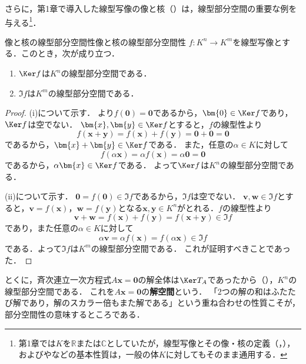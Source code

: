 さらに，第1章で導入した線型写像の像と核（）は，線型部分空間の重要な例を与える\footnote{第1章では$K$を$\mathbb{R}$または$\mathbb{C}$としていたが，線型写像とその像・核の定義（，），およびやなどの基本性質は，一般の体$K$に対してもそのまま通用する．}．

\begin{prop}{像と核の線型部分空間性}{像と核の線型部分空間性}
  $f \colon K^n \to K^m$を線型写像とする．このとき，次が成り立つ．
  \begin{enumerate}[label=(\roman*),leftmargin=3.2em]
    \item $\Ker f$は$K^n$の線型部分空間である．
    \item $\Im f$は$K^m$の線型部分空間である．
  \end{enumerate}
\end{prop}

\begin{leftbar}
\begin{proof}
  (i)について示す．
  より$f(\bm{0}) = \bm{0}$であるから，$\bm{0} \in \Ker f$であり，$\Ker f$は空でない．
  $\bm{x}, \bm{y} \in \Ker f$とすると，$f$の線型性より
  \[
    f(\bm{x} + \bm{y}) = f(\bm{x}) + f(\bm{y}) = \bm{0} + \bm{0} = \bm{0}
  \]
  であるから，$\bm{x} + \bm{y} \in \Ker f$である．
  また，任意の$\alpha \in K$に対して
  \[
    f(\alpha\bm{x}) = \alpha f(\bm{x}) = \alpha\bm{0} = \bm{0}
  \]
  であるから，$\alpha\bm{x} \in \Ker f$である．
  よって$\Ker f$は$K^n$の線型部分空間である．

  (ii)について示す．
  $\bm{0} = f(\bm{0}) \in \Im f$であるから，$\Im f$は空でない．
  $\bm{v}, \bm{w} \in \Im f$とすると，$\bm{v} = f(\bm{x})$，$\bm{w} = f(\bm{y})$となる$\bm{x}, \bm{y} \in K^n$がとれる．$f$の線型性より
  \[
    \bm{v} + \bm{w} = f(\bm{x}) + f(\bm{y}) = f(\bm{x} + \bm{y}) \in \Im f
  \]
  であり，また任意の$\alpha \in K$に対して
  \[
    \alpha\bm{v} = \alpha f(\bm{x}) = f(\alpha\bm{x}) \in \Im f
  \]
  である．よって$\Im f$は$K^m$の線型部分空間である．
  これが証明すべきことであった．
\end{proof}
\end{leftbar}

とくに，斉次連立一次方程式$A\bm{x} = \bm{0}$の解全体は$\Ker T_A$であったから（），$K^n$の線型部分空間である．
これを$A\bm{x} = \bm{0}$の\textbf{解空間}という．
「$2$つの解の和はふたたび解であり，解のスカラー倍もまた解である」という重ね合わせの性質こそが，部分空間性の意味するところである．

